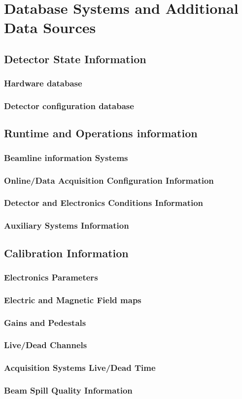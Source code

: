 %
\chapter{Database Systems and Additional Data Sources}

\section{Detector State Information}
\subsection{Hardware database}
\subsection{Detector configuration database}

\section{Runtime and Operations information}
\subsection{Beamline information Systems}
\subsection{Online/Data Acquisition Configuration Information}
\subsection{Detector and Electronics Conditions Information}
\subsection{Auxiliary Systems Information}

\section{Calibration Information}
\subsection{Electronics Parameters}
\subsection{Electric and Magnetic Field maps}
\subsection{Gains and Pedestals}
\subsection{Live/Dead Channels}
\subsection{Acquisition Systems Live/Dead Time}
\subsection{Beam Spill Quality Information}
